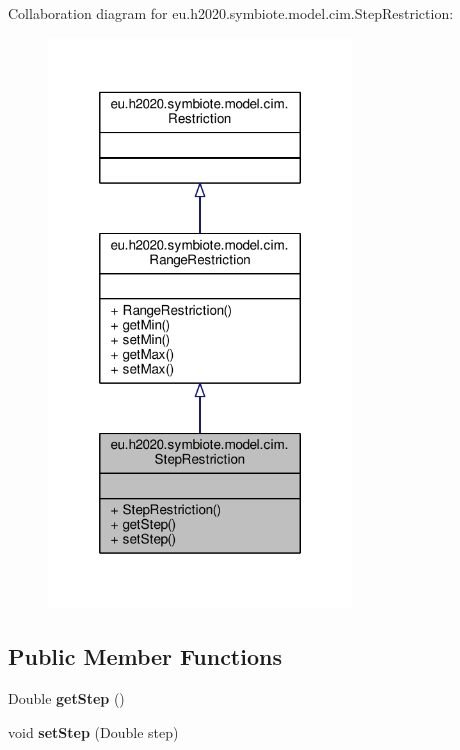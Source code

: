 Collaboration diagram for eu.\+h2020.\+symbiote.\+model.\+cim.\+Step\+Restriction\+:
\nopagebreak
\begin{figure}[H]
\begin{center}
\leavevmode
\includegraphics[width=228pt]{classeu_1_1h2020_1_1symbiote_1_1model_1_1cim_1_1StepRestriction__coll__graph}
\end{center}
\end{figure}
\subsection*{Public Member Functions}
\begin{DoxyCompactItemize}
\item 
\mbox{\label{classeu_1_1h2020_1_1symbiote_1_1model_1_1cim_1_1StepRestriction_a7f33fe6a7a031b879c819d4c1dc530fa}} 
Double {\bfseries get\+Step} ()
\item 
\mbox{\label{classeu_1_1h2020_1_1symbiote_1_1model_1_1cim_1_1StepRestriction_a68f42e97b69916abd218194e929ae1d4}} 
void {\bfseries set\+Step} (Double step)
\end{DoxyCompactItemize}


